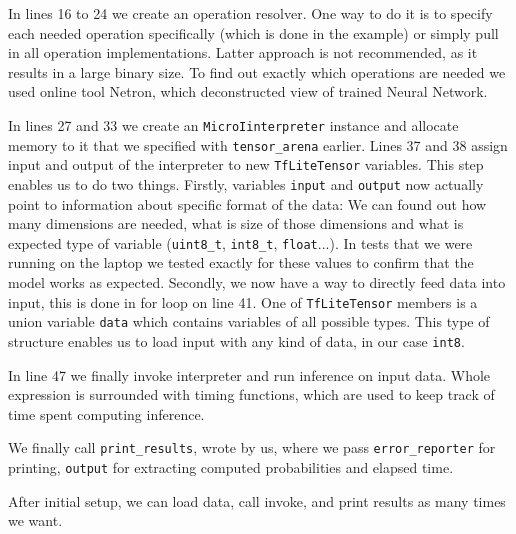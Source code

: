 In lines 16 to 24 we create an operation resolver.
One way to do it is to specify each needed operation specifically (which is done in the example) or simply pull in all operation implementations.
Latter approach is not recommended, as it results in a large binary size.
To find out exactly which operations are needed we used online tool Netron\cite{netron}, which deconstructed view of trained Neural Network.

In lines 27 and 33 we create an \verb|MicroIinterpreter| instance and allocate memory to it that we specified with \verb|tensor_arena| earlier.
Lines 37 and 38 assign input and output of the interpreter to new \verb|TfLiteTensor| variables.
This step enables us to do two things.
Firstly, variables \verb|input| and \verb|output| now actually point to information about specific format of the data: We can found out how many dimensions are needed, what is size of those dimensions and what is expected type of variable (\verb|uint8_t|, \verb|int8_t|, \verb|float|...).
In tests that we were running on the laptop we tested exactly for these values to confirm that the model works as expected.
Secondly, we now have a way to directly feed data into input, this is done in for loop on line 41.
One of \verb|TfLiteTensor| members is a union variable \verb|data| which contains variables of all possible types.
This type of structure enables us to load input with any kind of data, in our case \verb|int8|.

In line 47 we finally invoke interpreter and run inference on input data.
Whole expression is surrounded with timing functions, which are used to keep track of time spent computing inference.

We finally call \verb|print_results|, wrote by us, where we pass \verb|error_reporter| for printing, \verb|output| for extracting computed probabilities and elapsed time.

After initial setup, we can load data, call invoke, and print results as many times we want.

\lstset{style=mystyle}

